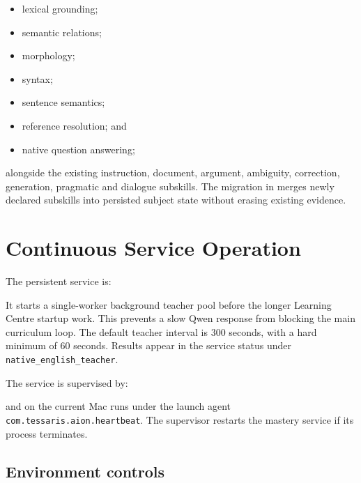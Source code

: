 \documentclass[11pt,a4paper]{article}
\begin{document}
\begin{itemize}
  \item lexical grounding;
  \item semantic relations;
  \item morphology;
  \item syntax;
  \item sentence semantics;
  \item reference resolution; and
  \item native question answering;
\end{itemize}

alongside the existing instruction, document, argument, ambiguity, correction, generation,
pragmatic and dialogue subskills. The migration in
 merges newly declared
subskills into persisted subject state without erasing existing evidence.

\section{Continuous Service Operation}

The persistent service is:

\begin{quote}
\end{quote}

It starts a single-worker background teacher pool before the longer Learning Centre startup
work. This prevents a slow Qwen response from blocking the main curriculum loop. The default
teacher interval is 300 seconds, with a hard minimum of 60 seconds. Results appear in the
service status under \texttt{native\_english\_teacher}.

The service is supervised by:

\begin{quote}
\end{quote}

and on the current Mac runs under the launch agent
\texttt{com.tessaris.aion.heartbeat}. The supervisor restarts the mastery service if its
process terminates.

\subsection{Environment controls}
\end{document}
